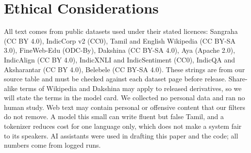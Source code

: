 \documentclass[11pt]{article}
\begin{document}
\section*{Ethical Considerations}
All text comes from public datasets used under their stated licences: Sangraha (CC BY 4.0), IndicCorp v2 (CC0), Tamil and English Wikipedia (CC BY-SA 3.0), FineWeb-Edu (ODC-By), Dakshina (CC BY-SA 4.0), Aya (Apache 2.0), IndicAlign (CC BY 4.0), IndicXNLI and IndicSentiment (CC0), IndicQA and Aksharantar (CC BY 4.0), Belebele (CC BY-SA 4.0).
These strings are from our source table and must be checked against each dataset page before release.
Share-alike terms of Wikipedia and Dakshina may apply to released derivatives, so we will state the terms in the model card.
We collected no personal data and ran no human study. Web text may contain personal or offensive content that our filters do not remove.
A model this small can write fluent but false Tamil, and a tokenizer reduces cost for one language only, which does not make a system fair to its speakers.
AI assistants were used in drafting this paper and the code; all numbers come from logged runs.



\end{document}
